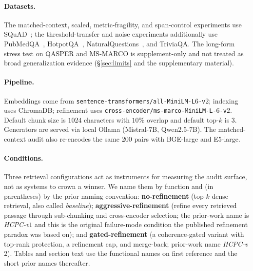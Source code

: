 \paragraph{Datasets.} The matched-context, scaled, metric-fragility,
and span-control experiments use SQuAD~\citep{rajpurkar2016squad}; the
threshold-transfer and noise experiments additionally use
PubMedQA~\citep{jin2019pubmedqa}, HotpotQA~\citep{yang2018hotpotqa},
NaturalQuestions~\citep{kwiatkowski2019nq}, and TriviaQA. The long-form
stress test on QASPER and MS-MARCO is supplement-only and not treated
as broad generalization evidence (\S\ref{sec:limits} and the
supplementary material).

\paragraph{Pipeline.} Embeddings come from
\texttt{sentence-transformers/all-MiniLM-L$6$-v$2$}; indexing uses
ChromaDB; refinement uses
\texttt{cross-encoder/ms-marco-MiniLM-L-$6$-v$2$}. Default chunk size is
$1024$ characters with $10\%$ overlap and default top-$k$ is $3$.
Generators are served via local Ollama (Mistral-$7$B,
Qwen$2.5$-$7$B). The matched-context audit also re-encodes the same
$200$ pairs with BGE-large and E5-large.

\paragraph{Conditions.} Three retrieval configurations act as
instruments for measuring the audit surface, not as systems to crown
a winner. We name them by function and (in parentheses) by the prior
naming convention: \textbf{no-refinement} (top-$k$ dense retrieval,
also called \emph{baseline}); \textbf{aggressive-refinement} (refine
every retrieved passage through sub-chunking and cross-encoder
selection; the prior-work name is \emph{HCPC-v$1$} and this is the
original failure-mode condition the published refinement paradox was
based on); and \textbf{gated-refinement} (a coherence-gated variant
with top-rank protection, a refinement cap, and merge-back; prior-work
name \emph{HCPC-v$2$}). Tables and section text use the functional
names on first reference and the short prior names thereafter.

